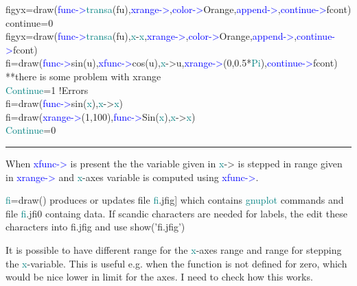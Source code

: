 \begin{example}[drawex]
figyx=\textcolor{VioletRed}{draw}(\textcolor{blue}{func->}\textcolor{teal}{transa}(fu),\textcolor{blue}{xrange->},\textcolor{blue}{color->}Orange,\textcolor{blue}{append->},\textcolor{blue}{continue->}fcont)\\ 
continue=0\\ 
figyx=\textcolor{VioletRed}{draw}(\textcolor{blue}{func->}\textcolor{teal}{transa}(fu),\textcolor{teal}{x}-\textcolor{teal}{x},\textcolor{blue}{xrange->},\textcolor{blue}{color->}Orange,\textcolor{blue}{append->},\textcolor{blue}{continue->}fcont)\\ 
fi=\textcolor{VioletRed}{draw}(\textcolor{blue}{func->}\textcolor{VioletRed}{sin}(u),\textcolor{blue}{xfunc->}\textcolor{VioletRed}{cos}(u),\textcolor{teal}{x}->u,\textcolor{blue}{xrange->}(0,0.5*\textcolor{teal}{Pi}),\textcolor{blue}{continue->}fcont)\\ 
{\color{ForestGreen}**there is some problem with xrange}\\ 
\textcolor{teal}{Continue}=1\,\,{\color{ForestGreen}!Errors}\\ 
fi=\textcolor{VioletRed}{draw}(\textcolor{blue}{func->}\textcolor{VioletRed}{sin}(\textcolor{teal}{x}),\textcolor{teal}{x}->\textcolor{teal}{x})\\ 
fi=\textcolor{VioletRed}{draw}(\textcolor{blue}{xrange->}(1,100),\textcolor{blue}{func->}Sin(\textcolor{teal}{x}),\textcolor{teal}{x}->\textcolor{teal}{x})\\ 
\textcolor{teal}{Continue}=0\\ 
\end{example} 
\vspace{-7mm} \rule{5cm}{0.1pt} 
\onehalfspacing 
\begin{note} 
When \textcolor{blue}{xfunc->} is present the the variable given in \textcolor{teal}{x}-> is stepped in range given in \textcolor{blue}{xrange->} 
and \textcolor{teal}{x}-axes variable is computed using \textcolor{blue}{xfunc->}. 
\end{note} 
\begin{note} 
\textcolor{teal}{fi}=\textcolor{VioletRed}{draw}() produces or updates file \textcolor{teal}{fi}.jfig] which contains 
\textcolor{teal}{gnuplot} commands and file \textcolor{teal}{fi}.jfi0 containg data. If scandic characters are needed 
for labels, the edit these characters into fi.jfig and use \textcolor{VioletRed}{show}('fi.jfig') 
\end{note} 
\begin{note} 
It is possible to have different range for the \textcolor{teal}{x}-axes range and range for stepping 
the \textcolor{teal}{x}-variable. This is useful e.g. when the function is not defined for zero, which would 
be nice lower in limit for the axes. I need to check how this works. 
\end{note} 

